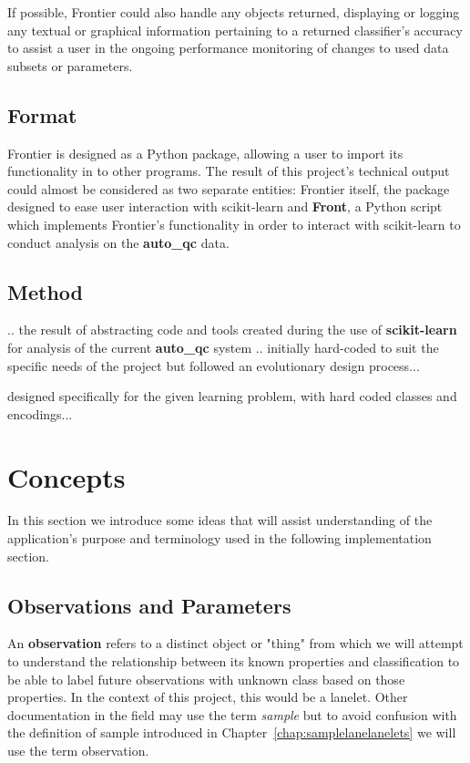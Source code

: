 If possible, Frontier could also handle any objects returned, displaying or
logging any textual or graphical information pertaining to a returned
classifier's accuracy to assist a user in the ongoing performance monitoring of
changes to used data subsets or parameters.


\subsection{Format}

Frontier is designed as a Python package, allowing a user to import its
functionality in to other programs. The result of this project's technical
output could almost be considered as two separate entities: Frontier itself, the
package designed to ease user interaction with scikit-learn and \textbf{Front},
a Python script which implements Frontier's functionality in order to interact
with scikit-learn to conduct analysis on the \textbf{auto\_qc} data.


\subsection{Method}
\label{sec:frontier-method}

.. the result of abstracting code and tools created during the use of
\textbf{scikit-learn} for analysis of the current \textbf{auto\_qc} system
.. initially hard-coded to suit the specific needs of the project but followed
an evolutionary design process...

designed specifically for the given learning problem, with hard coded
classes and encodings...


\section{Concepts}

In this section we introduce some ideas that will assist
understanding of the application's purpose and terminology used in the following
implementation section.


\subsection{Observations and Parameters}

An \textbf{observation} refers to a distinct object or "thing" from which we
will attempt to understand the relationship between its known properties and
classification to be able to label future observations with unknown class based
on those properties. In the context of this project, this would be a lanelet.
Other documentation in the field may use the term \textit{sample} but to avoid
confusion with the definition of sample introduced in
Chapter~\ref{chap:samplelanelanelets} we will use the term observation.

